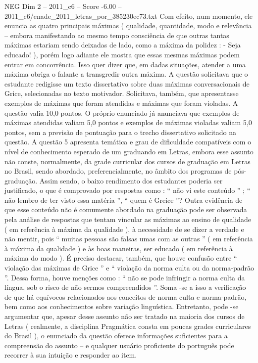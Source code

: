 \begin{textsample}{NEG Dim 2 – 2011\_c6 – Score -6.00 – 2011\_c6/enade\_2011\_letras\_por\_385230ec73.txt}
Com efeito, num momento, ele enuncia as quatro principais máximas ( qualidade, quantidade, modo e relevância – embora manifestando ao mesmo tempo consciência de que outras tantas máximas estariam sendo deixadas de lado, como a máxima da polidez : - Seja educado! ), porém logo adiante ele mostra que essas mesmas máximas podem entrar em concorrência.
Isso quer dizer que, em dadas situações, atender a uma máxima obriga o falante a transgredir outra máxima.
A questão solicitava que o estudante redigisse um texto dissertativo sobre duas máximas conversacionais de Grice, selecionadas no texto motivador.
Solicitava, também, que apresentasse exemplos de máximas que foram atendidas e máximas que foram violadas.
A questão valia 10,0 pontos.
O próprio enunciado já anunciava que exemplos de máximas atendidas valiam 5,0 pontos e exemplos de máximas violadas valiam 5,0 pontos, sem a previsão de pontuação para o trecho dissertativo solicitado na questão.
A questão 5 apresenta temática e grau de dificuldade compatíveis com o nível de conhecimento esperado de um graduando em Letras, embora esse assunto não conste, normalmente, da grade curricular dos cursos de graduação em Letras no Brasil, sendo abordado, preferencialmente, no âmbito dos programas de pós-graduação.
Assim sendo, o baixo rendimento dos estudantes poderia ser justificado, o que é comprovado por respostas como : “ não vi este conteúdo ” ; “ não lembro de ter visto essa matéria ”, “ quem é Greice ”?
Outra evidência de que esse conteúdo não é comumente abordado na graduação pode ser observada pela análise de respostas que tentam vincular as máximas ao ensino de qualidade ( em referência à máxima da qualidade ), à necessidade de se dizer a verdade e não mentir, pois “ muitas pessoas são falsas umas com as outras ” ( em referência à máxima da qualidade ) e às boas maneiras, ser educado ( em referência à máxima do modo ).
É preciso destacar, também, que houve confusão entre “ violação das máximas de Grice ” e “ violação da norma culta ou da norma-padrão ”.
Dessa forma, houve menções como : “ não se pode infringir a norma culta da língua, sob o risco de não sermos compreendidos ”.
Soma -se a isso a verificação de que há equívocos relacionados aos conceitos de norma culta e norma-padrão, bem como aos conhecimentos sobre variação linguística.
Entretanto, pode -se argumentar que, apesar desse assunto não ser tratado na maioria dos cursos de Letras ( realmente, a disciplina Pragmática consta em poucas grades curriculares do Brasil ), o enunciado da questão oferece informações suficientes para a compreensão do assunto – e qualquer usuário proficiente do português pode recorrer à sua intuição e responder ao item.

\end{textsample}

